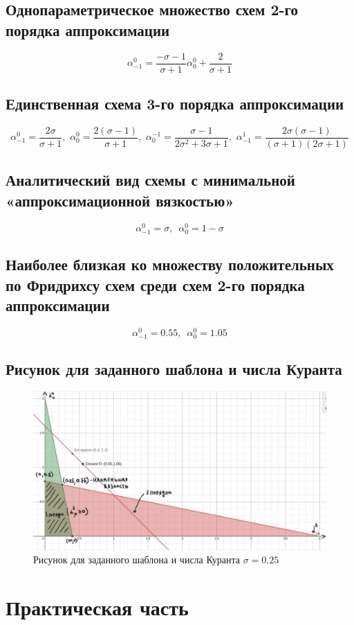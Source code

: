 \documentclass[a4paper, 12pt]{article} %
\begin{document}
\subsection{Однопараметрическое множество схем 2-го порядка аппроксимации}
\label{subsec:2t}
$$\alpha^{0}_{-1} = \frac{-\sigma-1}{\sigma+1} \alpha^{0}_{0}+ \frac{2}{\sigma+1}$$

\subsection{Единственная схема 3-го порядка аппроксимации}
\label{subsec:3t}
$$\alpha^{0}_{-1} = \frac{2\sigma}{\sigma + 1},\,\, 
  \alpha^{0}_{0} = \frac{2(\sigma - 1)}{\sigma + 1}, \,\,
  \alpha^{-1}_{0} = \frac{\sigma - 1}{2\sigma^2 + 3\sigma + 1},\,\,
  \alpha^{1}_{-1} = \frac{2\sigma(\sigma-1)}{(\sigma+1)(2\sigma + 1)}$$



\subsection{Аналитический вид схемы с минимальной «аппроксимационной вязкостью»}
\label{subsec:4t}
$$\alpha^{0}_{-1} = \sigma, \,\,\, \alpha^{0}_{0} = 1-\sigma$$

\subsection{Наиболее близкая ко множеству положительных по Фридрихсу схем среди схем 2-го порядка аппроксимации}
\label{subsec:5t}
$$\alpha^{0}_{-1} = 0.55, \,\,\, \alpha^{0}_{0} = 1.05$$

\subsection{Рисунок для заданного шаблона и числа Куранта}
\label{subsec:6t}
\begin{figure}[h!]
    \centering
    \includegraphics[width=17cm]{risunok.jpg}
    \caption{Рисунок для заданного шаблона и числа Куранта $\sigma = 0.25$}
    \label{fig:vac}
\end{figure} 


\section{Практическая часть}
\end{document}
